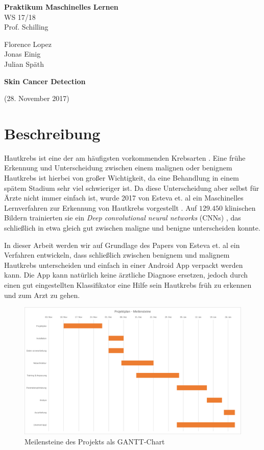 \documentclass[%
   10pt,              %
   a4paper,           %
   DIV10,             %
]{scrartcl}%
\def\header#1#2#3#4#5#6{\pagestyle{empty}
\noindent
\begin{minipage}[t]{0.6\textwidth}
\begin{flushleft}
\textbf{#4}\\%
#6\\%
#2  %
\end{flushleft}
\end{minipage}
\begin{minipage}[t]{0.4\textwidth}
\begin{flushright}
\vspace*{0.2cm}
#5%
\end{flushright}
\end{minipage}

\begin{center}
{\Large\textbf{ #1}} %

{(#3)} %
\end{center}
}
\begin{document}
\header{Skin Cancer Detection}{Prof. Schilling}{28. November 2017}{Praktikum Maschinelles Lernen}{Florence Lopez \\ Jonas Einig \\ Julian Späth}{WS 17/18}

\section*{Beschreibung}
Hautkrebs ist eine der am häufigsten vorkommenden Krebsarten \cite{cancer}. Eine frühe Erkennung und Unterscheidung zwischen einem malignen oder benignem Hautkrebs ist hierbei von großer Wichtigkeit, da eine Behandlung in einem spätem Stadium sehr viel schwieriger ist. Da diese Unterscheidung aber selbst für Ärzte nicht immer einfach ist, wurde 2017 von Esteva et. al ein Maschinelles Lernverfahren zur Erkennung von Hautkrebs vorgestellt \cite{skincancer}. Auf $129.450$ klinischen Bildern trainierten sie ein \textit{Deep convolutional neural networks} (CNNs) \cite{cnn}, das schließlich in etwa gleich gut zwischen maligne und benigne unterscheiden konnte.  

In dieser Arbeit werden wir auf Grundlage des Papers von Esteva et. al ein Verfahren entwickeln, dass schließlich zwischen benignem und malignem Hautkrebs unterscheiden und einfach in einer Android App verpackt werden kann. Die App kann natürlich keine ärztliche Diagnose ersetzen, jedoch durch einen gut eingestellten Klassifikator eine Hilfe sein Hautkrebs früh zu erkennen und zum Arzt zu gehen. 

 \begin{figure}[ht]
	\centering
 \includegraphics[width=\textwidth]{fig/gantt_projektplan}
 \caption{Meilensteine des Projekts als GANTT-Chart}
	\label{fig_gantt}
 \end{figure}
\end{document}
